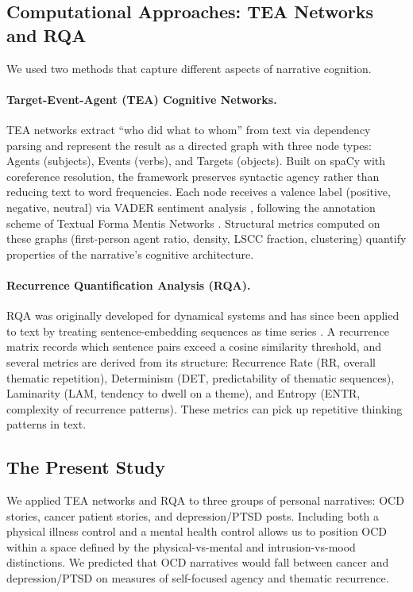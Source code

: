 \documentclass[11pt,a4paper]{article}
\begin{document}
\subsection{Computational Approaches: TEA Networks and RQA}

We used two methods that capture different aspects of narrative cognition.

\paragraph{Target-Event-Agent (TEA) Cognitive Networks.}
TEA networks \citep{franchini2026tea} extract ``who did what to whom'' from text via dependency parsing and represent the result as a directed graph with three node types: Agents (subjects), Events (verbs), and Targets (objects). Built on spaCy with coreference resolution, the framework preserves syntactic agency rather than reducing text to word frequencies. Each node receives a valence label (positive, negative, neutral) via VADER sentiment analysis \citep{hutto2014}, following the annotation scheme of Textual Forma Mentis Networks \citep{stella2020}. Structural metrics computed on these graphs (first-person agent ratio, density, LSCC fraction, clustering) quantify properties of the narrative's cognitive architecture.

\paragraph{Recurrence Quantification Analysis (RQA).}
RQA was originally developed for dynamical systems \citep{eckmann1987,webber1994} and has since been applied to text by treating sentence-embedding sequences as time series \citep{marwan2007}. A recurrence matrix records which sentence pairs exceed a cosine similarity threshold, and several metrics are derived from its structure: Recurrence Rate (RR, overall thematic repetition), Determinism (DET, predictability of thematic sequences), Laminarity (LAM, tendency to dwell on a theme), and Entropy (ENTR, complexity of recurrence patterns). These metrics can pick up repetitive thinking patterns in text.

\subsection{The Present Study}

We applied TEA networks and RQA to three groups of personal narratives: OCD stories, cancer patient stories, and depression/PTSD posts. Including both a physical illness control and a mental health control allows us to position OCD within a space defined by the physical-vs-mental and intrusion-vs-mood distinctions. We predicted that OCD narratives would fall between cancer and depression/PTSD on measures of self-focused agency and thematic recurrence.
\end{document}
